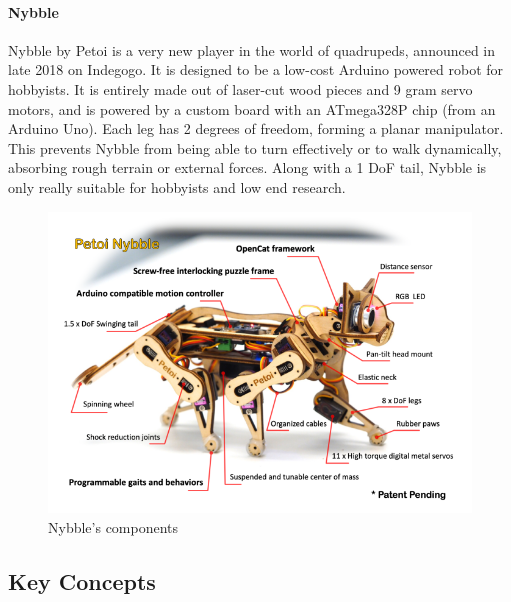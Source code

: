     \paragraph{Nybble} %
    Nybble by Petoi is a very new player in the world of quadrupeds, announced in late 2018 on Indegogo. It is designed to be a low-cost Arduino powered robot for hobbyists. It is entirely made out of laser-cut wood pieces and 9 gram servo motors, and is powered by a custom board with an ATmega328P chip (from an Arduino Uno). Each leg has 2 degrees of freedom, forming a planar manipulator. This prevents Nybble from being able to turn effectively or to walk dynamically, absorbing rough terrain or external forces. Along with a 1 DoF tail, Nybble is only really suitable for hobbyists and low end research.\cite{nybble}
    \begin{figure} [H]
        \centering
        \includegraphics[width=0.7\linewidth]{figures/Nybble.png}
        \caption{Nybble's components}
    \end{figure}

    \subsection{Key Concepts} %
